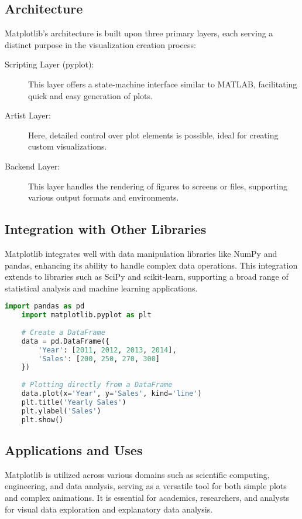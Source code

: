 \subsection{Architecture}

Matplotlib's architecture is built upon three primary layers, each serving a distinct purpose in the visualization creation process:

\begin{description}
	\item[Scripting Layer (pyplot):] This layer offers a state-machine interface similar to MATLAB, facilitating quick and easy generation of plots.
	\item[Artist Layer:] Here, detailed control over plot elements is possible, ideal for creating custom visualizations.
	\item[Backend Layer:] This layer handles the rendering of figures to screens or files, supporting various output formats and environments.
\end{description}

\subsection{Integration with Other Libraries}

Matplotlib integrates well with data manipulation libraries like NumPy and pandas, enhancing its ability to handle complex data operations. This integration extends to libraries such as SciPy and scikit-learn, supporting a broad range of statistical analysis and machine learning applications.

\begin{lstlisting}[language=Python, caption=Example - Plotting Data from pandas DataFrame]
	import pandas as pd
	import matplotlib.pyplot as plt
	
	# Create a DataFrame
	data = pd.DataFrame({
		'Year': [2011, 2012, 2013, 2014],
		'Sales': [200, 250, 270, 300]
	})
	
	# Plotting directly from a DataFrame
	data.plot(x='Year', y='Sales', kind='line')
	plt.title('Yearly Sales')
	plt.ylabel('Sales')
	plt.show()
\end{lstlisting}

\subsection{Applications and Uses}

Matplotlib is utilized across various domains such as scientific computing, engineering, and data analysis, serving as a versatile tool for both simple plots and complex animations. It is essential for academics, researchers, and analysts for visual data exploration and explanatory data analysis.

